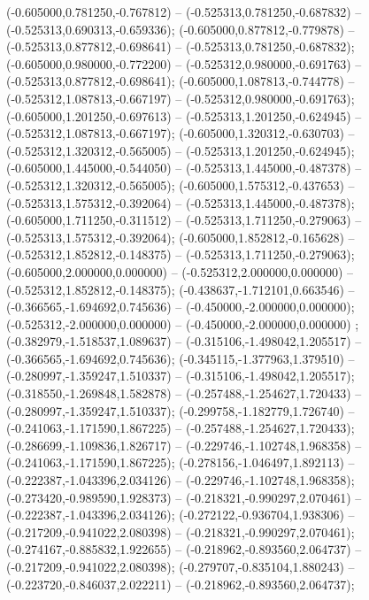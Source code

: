  (-0.605000,0.781250,-0.767812) -- (-0.525313,0.781250,-0.687832) -- (-0.525313,0.690313,-0.659336);
 (-0.605000,0.877812,-0.779878) -- (-0.525313,0.877812,-0.698641) -- (-0.525313,0.781250,-0.687832);
 (-0.605000,0.980000,-0.772200) -- (-0.525312,0.980000,-0.691763) -- (-0.525313,0.877812,-0.698641);
 (-0.605000,1.087813,-0.744778) -- (-0.525312,1.087813,-0.667197) -- (-0.525312,0.980000,-0.691763);
 (-0.605000,1.201250,-0.697613) -- (-0.525313,1.201250,-0.624945) -- (-0.525312,1.087813,-0.667197);
 (-0.605000,1.320312,-0.630703) -- (-0.525312,1.320312,-0.565005) -- (-0.525313,1.201250,-0.624945);
 (-0.605000,1.445000,-0.544050) -- (-0.525313,1.445000,-0.487378) -- (-0.525312,1.320312,-0.565005);
 (-0.605000,1.575312,-0.437653) -- (-0.525313,1.575312,-0.392064) -- (-0.525313,1.445000,-0.487378);
 (-0.605000,1.711250,-0.311512) -- (-0.525313,1.711250,-0.279063) -- (-0.525313,1.575312,-0.392064);
 (-0.605000,1.852812,-0.165628) -- (-0.525312,1.852812,-0.148375) -- (-0.525313,1.711250,-0.279063);
 (-0.605000,2.000000,0.000000) -- (-0.525312,2.000000,0.000000) -- (-0.525312,1.852812,-0.148375);
 (-0.438637,-1.712101,0.663546) -- (-0.366565,-1.694692,0.745636) -- (-0.450000,-2.000000,0.000000);
 (-0.525312,-2.000000,0.000000) -- (-0.450000,-2.000000,0.000000) ;
 (-0.382979,-1.518537,1.089637) -- (-0.315106,-1.498042,1.205517) -- (-0.366565,-1.694692,0.745636);
 (-0.345115,-1.377963,1.379510) -- (-0.280997,-1.359247,1.510337) -- (-0.315106,-1.498042,1.205517);
 (-0.318550,-1.269848,1.582878) -- (-0.257488,-1.254627,1.720433) -- (-0.280997,-1.359247,1.510337);
 (-0.299758,-1.182779,1.726740) -- (-0.241063,-1.171590,1.867225) -- (-0.257488,-1.254627,1.720433);
 (-0.286699,-1.109836,1.826717) -- (-0.229746,-1.102748,1.968358) -- (-0.241063,-1.171590,1.867225);
 (-0.278156,-1.046497,1.892113) -- (-0.222387,-1.043396,2.034126) -- (-0.229746,-1.102748,1.968358);
 (-0.273420,-0.989590,1.928373) -- (-0.218321,-0.990297,2.070461) -- (-0.222387,-1.043396,2.034126);
 (-0.272122,-0.936704,1.938306) -- (-0.217209,-0.941022,2.080398) -- (-0.218321,-0.990297,2.070461);
 (-0.274167,-0.885832,1.922655) -- (-0.218962,-0.893560,2.064737) -- (-0.217209,-0.941022,2.080398);
 (-0.279707,-0.835104,1.880243) -- (-0.223720,-0.846037,2.022211) -- (-0.218962,-0.893560,2.064737);
